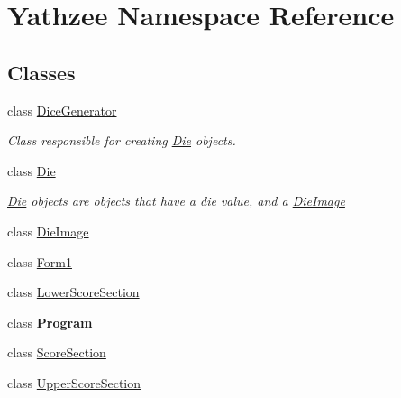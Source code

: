\hypertarget{namespace_yathzee}{}\section{Yathzee Namespace Reference}
\label{namespace_yathzee}
\subsection*{Classes}
\begin{DoxyCompactItemize}
\item 
class \hyperlink{class_yathzee_1_1_dice_generator}{Dice\+Generator}
\begin{DoxyCompactList}\small\item\em Class responsible for creating \hyperlink{class_yathzee_1_1_die}{Die} objects. \end{DoxyCompactList}\item 
class \hyperlink{class_yathzee_1_1_die}{Die}
\begin{DoxyCompactList}\small\item\em \hyperlink{class_yathzee_1_1_die}{Die} objects are objects that have a die value, and a \hyperlink{class_yathzee_1_1_die_image}{Die\+Image} \end{DoxyCompactList}\item 
class \hyperlink{class_yathzee_1_1_die_image}{Die\+Image}
\item 
class \hyperlink{class_yathzee_1_1_form1}{Form1}
\item 
class \hyperlink{class_yathzee_1_1_lower_score_section}{Lower\+Score\+Section}
\item 
class {\bfseries Program}
\item 
class \hyperlink{class_yathzee_1_1_score_section}{Score\+Section}
\item 
class \hyperlink{class_yathzee_1_1_upper_score_section}{Upper\+Score\+Section}
\end{DoxyCompactItemize}
